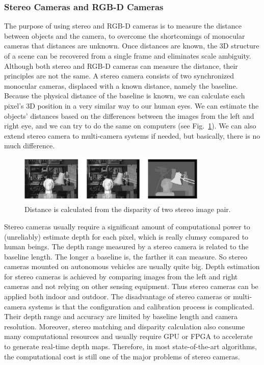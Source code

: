 \subsubsection{Stereo Cameras and RGB-D Cameras}
The purpose of using stereo and RGB-D cameras is to measure the distance between objects and the camera, to overcome the shortcomings of monocular cameras that distances are unknown. Once distances are known, the 3D structure of a scene can be recovered from a single frame and eliminates scale ambiguity. Although both stereo and RGB-D cameras can measure the distance, their principles are not the same. A stereo camera consists of two synchronized monocular cameras, displaced with a known distance, namely the baseline. Because the physical distance of the baseline is known, we can calculate each pixel's 3D position in a very similar way to our human eyes. We can estimate the objects' distances based on the differences between the images from the left and right eye, and we can try to do the same on computers (see Fig.~\ref{fig:stereo}). We can also extend stereo camera to multi-camera systems if needed, but basically, there is no much difference.

\begin{figure}
    \centering
    \includegraphics[width=0.8\textwidth]{./resources/whatIsSLAM/stereo.pdf}
    \caption{Distance is calculated from the disparity of two stereo image pair.}
    \label{fig:stereo}
\end{figure}

Stereo cameras usually require a significant amount of computational power to (unreliably) estimate depth for each pixel, which is really clumsy compared to human beings. The depth range measured by a stereo camera is related to the baseline length. The longer a baseline is, the farther it can measure. So stereo cameras mounted on autonomous vehicles are usually quite big. Depth estimation for stereo cameras is achieved by comparing images from the left and right cameras and not relying on other sensing equipment. Thus stereo cameras can be applied both indoor and outdoor. The disadvantage of stereo cameras or multi-camera systems is that the configuration and calibration process is complicated. Their depth range and accuracy are limited by baseline length and camera resolution. Moreover, stereo matching and disparity calculation also consume many computational resources and usually require GPU or FPGA to accelerate to generate real-time depth maps. Therefore, in most state-of-the-art algorithms, the computational cost is still one of the major problems of stereo cameras.


